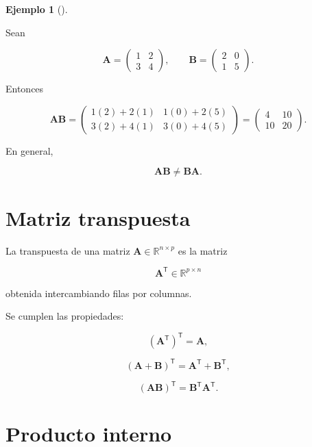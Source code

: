 \documentclass[
  spanish,
  11pt,
  letterpaper,
  DIV=11,
  numbers=noendperiod]{scrreprt}
\theoremstyle{definition}
\theoremstyle{plain}
\theoremstyle{definition}
\newtheorem{example}{Ejemplo}[chapter]
\theoremstyle{remark}
\begin{document}
\begin{example}[]\protect\hypertarget{exm-producto-matricial}{}\label{exm-producto-matricial}

Sean

\[
\mathbf{A}
=
\begin{pmatrix}
1 & 2\\
3 & 4
\end{pmatrix},
\qquad
\mathbf{B}
=
\begin{pmatrix}
2 & 0\\
1 & 5
\end{pmatrix}.
\]

Entonces

\[
\mathbf{A}\mathbf{B}
=
\begin{pmatrix}
1(2)+2(1) & 1(0)+2(5)\\
3(2)+4(1) & 3(0)+4(5)
\end{pmatrix}
=
\begin{pmatrix}
4 & 10\\
10 & 20
\end{pmatrix}.
\]

\end{example}

En general,

\[
\mathbf{A}\mathbf{B}
\neq
\mathbf{B}\mathbf{A}.
\]

\section{Matriz transpuesta}\label{matriz-transpuesta}

La transpuesta de una matriz \(\mathbf{A}\in\mathbb{R}^{n\times p}\) es
la matriz

\[
\mathbf{A}^{\mathsf T}\in\mathbb{R}^{p\times n}
\]

obtenida intercambiando filas por columnas.

Se cumplen las propiedades:

\[
(\mathbf{A}^{\mathsf T})^{\mathsf T}
=
\mathbf{A},
\]

\[
(\mathbf{A}+\mathbf{B})^{\mathsf T}
=
\mathbf{A}^{\mathsf T}
+
\mathbf{B}^{\mathsf T},
\]

\[
(\mathbf{A}\mathbf{B})^{\mathsf T}
=
\mathbf{B}^{\mathsf T}
\mathbf{A}^{\mathsf T}.
\]

\section{Producto interno}\label{producto-interno}
\end{document}
